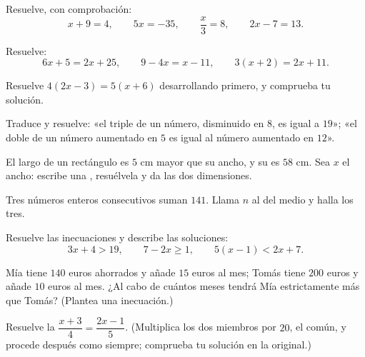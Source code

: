 \begin{exercise}[$\star$]\label{exo:g8:equations:4}
Resuelve, con comprobación:
\[
x + 9 = 4, \qquad
5x = -35, \qquad
\frac{x}{3} = 8, \qquad
2x - 7 = 13 .
\]
\end{exercise}

\begin{exercise}[$\star$]\label{exo:g8:equations:5}
Resuelve:
\[
6x + 5 = 2x + 25, \qquad
9 - 4x = x - 11, \qquad
3(x + 2) = 2x + 11 .
\]
\end{exercise}

\begin{exercise}[$\star$]\label{exo:g8:equations:6}
Resuelve $4(2x - 3) = 5(x + 6)$ desarrollando primero, y comprueba tu
solución.
\end{exercise}

\begin{exercise}[$\star$]\label{exo:g8:equations:7}
Traduce y resuelve: «el triple de un número, disminuido en $8$, es igual a
$19$»; «el doble de un número aumentado en $5$ es igual al número
aumentado en $12$».
\end{exercise}

\begin{exercise}[$\star\star$]\label{exo:g8:equations:8}
El largo de un rectángulo es $5$ cm mayor que su ancho, y su 
es $58$ cm. Sea $x$ el ancho: escribe una , resuélvela y da
las dos dimensiones.
\end{exercise}

\begin{exercise}[$\star\star$]\label{exo:g8:equations:9}
Tres números enteros consecutivos suman $141$. Llama $n$ al del medio
y halla los tres.
\end{exercise}

\begin{exercise}[$\star\star$]\label{exo:g8:equations:10}
Resuelve las inecuaciones y describe las soluciones:
\[
3x + 4 > 19, \qquad
7 - 2x \geq 1, \qquad
5(x - 1) < 2x + 7 .
\]
\end{exercise}

\begin{exercise}[$\star\star$]\label{exo:g8:equations:11}
Mía tiene $140$ euros ahorrados y añade $15$ euros al mes; Tomás
tiene $200$ euros y añade $10$ euros al mes. ¿Al cabo de cuántos meses
tendrá Mía estrictamente más que Tomás? (Plantea una inecuación.)
\end{exercise}

\begin{exercise}[$\star\star\star$]\label{exo:g8:equations:12}
Resuelve la  $\dfrac{x + 3}{4} = \dfrac{2x - 1}{5}$.
(Multiplica los dos miembros por $20$, el  común, y procede después como
siempre; comprueba tu solución en la  original.)
\end{exercise}

